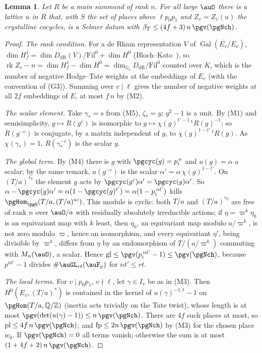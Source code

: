 \documentclass[10pt]{amsart}
\newtheorem{lemma}[theorem]{Lemma}
\theoremstyle{definition}
\theoremstyle{remark}
\newcommand{\Z}{\mathbb Z}
\newcommand{\Q}{\mathbb Q}
\begin{document}
\begin{lemma}\label{pg:beta}
Let $R$ be a main summand of rank $n$. For all large $\auO$ there is a lattice $u$ in $R$ that,
with $S$ the set of places above $\ell p_0p_1$ and $Z_v=Z_v(u)$ the crystalline cocycles, is a
Selmer datum with $\beta_T\le(4f+3)\,n\,\pgv(\pgNch)$.
\end{lemma}
\begin{proof}
\emph{The rank condition.} For a de Rham representation $V$ of $\operatorname{Gal}(\overline{E_v}
/E_v)$, $\dim H^1_f=\dim D_{\mathrm{dR}}(V)/\mathrm{Fil}^0+\dim H^0$ (Bloch--Kato~\cite[Corollary~3.8.4]{BlochKato}), so $\operatorname{rk}Z_v-n=\dim H^1_f-\dim H^0=\dim_{\Q_\ell}D_{\mathrm{dR}}/
\mathrm{Fil}^0$ counted over $K$, which is the number of negative Hodge--Tate weights at the
embeddings of $E_v$ (with the convention of (G3)). Summing over $v\mid\ell$ gives the number of
negative weights at all $2f$ embeddings of $E$, at most $f\,n$ by (M2).

\emph{The scalar element.} Take $\gamma_*=s$ from (M5), $\zeta_*=y$; $y^2-1$ is a unit. By (M1)
and semisimplicity, $g\mapsto R(g^c)$ is isomorphic to $g\mapsto\chi(g)^{t'-1}\,{}^{\mathrm
t}R(g)^{-1}$; so $R(g^{-c})$ is conjugate, by a matrix independent of $g$, to
$\chi(g)^{1-t'}\,{}^{\mathrm t}R(g)$. As $\chi(\gamma_*)=1$, $R(\gamma_*^{-c})$ is the scalar
$y$.

\emph{The global term.} By (M4) there is $g$ with $\pgcyc(g)=p_i^{\,n}$ and $u(g)=\alpha$ a
scalar; by the same remark, $u(g^{-c})$ is the scalar $\alpha'=\alpha\,\chi(g)^{1-t'}$. On $(T/a)^{*c}$ the
element $g$ acts by $\pgcyc(g^c)\alpha'=\pgcyc(g)\alpha'$. So $\alpha-\pgcyc(g)\alpha'=\alpha(1-
\pgcyc(g)^{t'})=\alpha(1-p_i^{\,nt'})$ kills $\pgHom_{\pgG}(T/a,(T/a)^{*c})$. This module is
cyclic: both $T/a$ and $(T/a)^{*c}$ are free of rank $n$ over $\auO/a$ with residually absolutely
irreducible actions; if $\eta=\varpi^k\eta_0$ is an equivariant map with $k$ least, then $\eta_0$,
an equivariant map modulo $a/\varpi^k$, is not zero modulo $\varpi$, hence an isomorphism, and
every equivariant $\eta'$, being divisible by $\varpi^k$, differs from $\eta$ by an endomorphism
of $T/(a/\varpi^k)$ commuting with $M_n(\auO)$, a scalar. Hence $\mathrm{gl}\le\pgv(p_i^{\,nt'}-1)\le\pgv(\pgNch)$, because
$p^{nt'}-1$ divides $\#\auGL_{rt}(\auF_p)$ for $nt'\le rt$.

\emph{The local terms.} For $v\mid p_0p_1$, $v\nmid\ell$, let $\gamma\in I_v$ be as in (M3). Then
$H^0(E_v,(T/a)^*)$ is contained in the kernel of $u(\gamma)^{-1,\mathrm t}-1$ on
$\pgHom(T/a,\Q/\Z)$ (inertia acts trivially on the Tate twist), whose length is at most
$\pgv(\det(u(\gamma)-1))\le n\,\pgv(\pgNch)$. There are $4f$ such places at most, so
$\mathrm{pl}\le4f\,n\,\pgv(\pgNch)$; and $\mathrm{fp}\le2n\,\pgv(\pgNch)$ by (M3) for the chosen
place $w_0$. If $\pgv(\pgNch)=0$ all terms vanish; otherwise the sum is at most $(1+4f+2)\,n\,
\pgv(\pgNch)$.
\end{proof}
\end{document}
